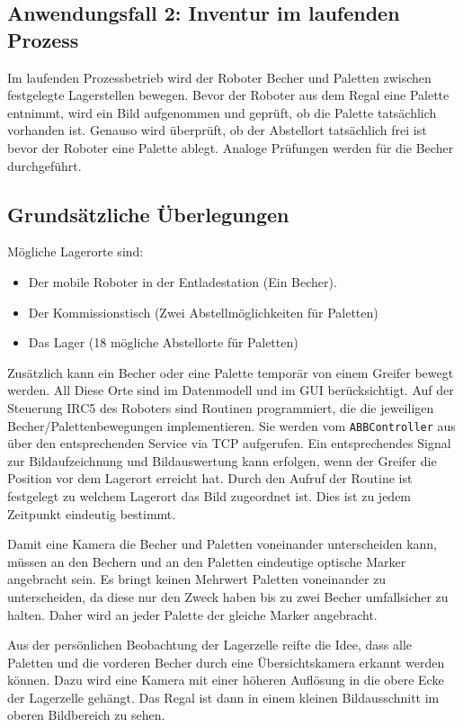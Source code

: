     \subsection{Anwendungsfall 2: Inventur im laufenden Prozess}\label{InventurImProzess}

    Im laufenden Prozessbetrieb wird der Roboter Becher und Paletten zwischen festgelegte Lagerstellen bewegen.
    Bevor der Roboter aus dem Regal eine Palette entnimmt, wird ein Bild aufgenommen und geprüft, ob die Palette tatsächlich vorhanden ist.
    Genauso wird überprüft, ob der Abstellort tatsächlich frei ist bevor der Roboter eine Palette ablegt.
    Analoge Prüfungen werden für die Becher durchgeführt.

    \subsection{Grundsätzliche Überlegungen}
    Mögliche Lagerorte sind:
    \begin{itemize}
        \item Der mobile Roboter in der Entladestation (Ein Becher). 
        \item Der Kommissionstisch (Zwei Abstellmöglichkeiten für Paletten)
        \item Das Lager (18 mögliche Abstellorte für Paletten)
    \end{itemize}
    Zusätzlich kann ein Becher oder eine Palette temporär von einem Greifer bewegt werden. 
    All Diese Orte sind im Datenmodell und im GUI berücksichtigt. 
    Auf der Steuerung IRC5 des Roboters sind Routinen programmiert, die die jeweiligen Becher/Palettenbewegungen implementieren.
    Sie werden vom \verb|ABBController| aus über den entsprechenden Service via TCP aufgerufen. 
    Ein entsprechendes Signal zur Bildaufzeichnung und Bildauswertung kann erfolgen, wenn der Greifer die Position vor dem Lagerort erreicht hat. 
    Durch den Aufruf der Routine ist festgelegt zu welchem Lagerort das Bild zugeordnet ist.
    Dies ist zu jedem Zeitpunkt eindeutig bestimmt. 

    Damit eine Kamera die Becher und Paletten voneinander unterscheiden kann, müssen an den Bechern und an den Paletten eindeutige optische Marker angebracht sein. 
    Es bringt keinen Mehrwert Paletten voneinander zu unterscheiden, da diese nur den Zweck haben bis zu zwei Becher umfallsicher zu halten. 
    Daher wird an jeder Palette der gleiche Marker angebracht.

    Aus der persönlichen Beobachtung der Lagerzelle reifte die Idee, dass alle Paletten und die vorderen Becher durch eine Übersichtskamera erkannt werden können. 
    Dazu wird eine Kamera mit einer höheren Auflösung in die obere Ecke der Lagerzelle gehängt. 
    Das Regal ist dann in einem kleinen Bildausschnitt im oberen Bildbereich zu sehen. 

